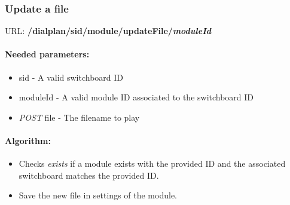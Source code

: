 \subsubsection{Update a file}
URL: \textbf{/dialplan/{sid}/module/updateFile/{\textit{moduleId}}}

\paragraph{Needed parameters:}
\begin{itemize}
\item {sid} - A valid switchboard ID
\item {moduleId} - A valid module ID associated to the switchboard ID
\item \textit{POST} {file} - The filename to play
\end{itemize}


\paragraph{Algorithm:}
\begin{itemize}
	\item Checks \textit{exists} if a module exists with the provided ID and the associated switchboard matches the provided ID.
	\item Save the new file in settings of the module.

\end{itemize}


